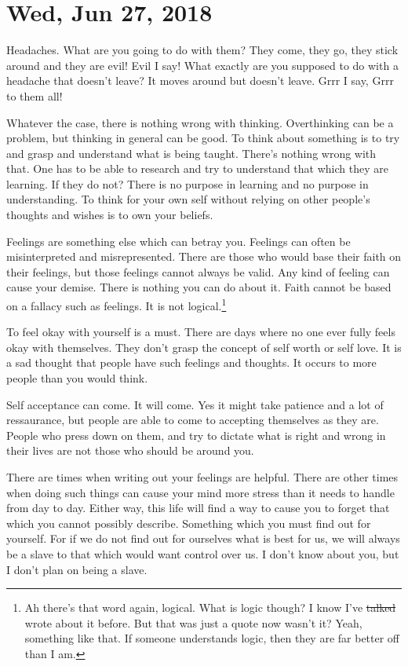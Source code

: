 \section{Wed, Jun 27, 2018}

Headaches. What are you going to do with them? They come, they go, they stick
around and they are evil! Evil I say! What exactly are you supposed to do with a
headache that doesn't leave? It moves around but doesn't leave. Grrr I say, Grrr
to them all!

Whatever the case, there is nothing wrong with thinking. Overthinking can be a
problem, but thinking in general can be good. To think about something is to try
and grasp and understand what is being taught. There's nothing wrong with that.
One has to be able to research and try to understand that which they are
learning. If they do not? There is no purpose in learning and no purpose in
understanding. To think for your own self without relying on other people's
thoughts and wishes is to own your beliefs.

Feelings are something else which can betray you. Feelings can often be
misinterpreted and misrepresented. There are those who would base their faith on
their feelings, but those feelings cannot always be valid. Any kind of feeling
can cause your demise. There is nothing you can do about it. Faith cannot be
based on a fallacy such as feelings. It is not logical.\footnote{
Ah there's that word again, logical. What is logic though? I know I've 
\st{talked} wrote about it before. But that was just a quote now wasn't it?
Yeah, something like that. If someone understands logic, then they are far
better off than I am.
}

To feel okay with yourself is a must. There are days where no one ever fully
feels okay with themselves. They don't grasp the concept of self worth or self
love. It is a sad thought that people have such feelings and thoughts. It occurs
to more people than you would think.

Self acceptance can come. It will come. Yes it might take patience and a lot of
ressaurance, but people are able to come to accepting themselves as they are.
People who press down on them, and try to dictate what is right and wrong in
their lives are not those who should be around you.

There are times when writing out your feelings are helpful. There are other
times when doing such things can cause your mind more stress than it needs to
handle from day to day. Either way, this life will find a way to cause you to
forget that which you cannot possibly describe. Something which you must find
out for yourself. For if we do not find out for ourselves what is best for us,
we will always be a slave to that which would want control over us. I don't know
about you, but I don't plan on being a slave.

